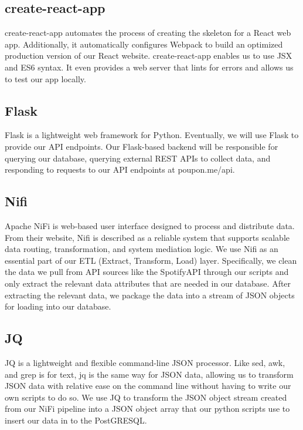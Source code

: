 \documentclass{scrartcl}
\begin{document}
    \subsection{create-react-app}\label{subsec:create-react-app}
    create-react-app automates the process of creating the skeleton for a React web app.
    Additionally, it automatically configures Webpack to build an optimized production version of our React website.
    create-react-app enables us to use JSX and ES6 syntax.
    It even provides a web server that lints for errors and allows us to test our app locally.

    \subsection{Flask}\label{subsec:flask}
    Flask is a lightweight web framework for Python.
    Eventually, we will use Flask to provide our API endpoints.
    Our Flask-based backend will be responsible for querying our database, querying external REST APIs to collect data, and responding to requests to our API endpoints at poupon.me/api.

    \subsection{Nifi}\label{subsec:nifi}
    Apache NiFi is web-based user interface designed to process and distribute data.
    From their website, Nifi is described as a reliable system that supports scalable data routing, transformation, and system mediation logic.
    We use Nifi as an essential part of our ETL (Extract, Transform, Load) layer.
    Specifically, we clean the data we pull from API sources like the SpotifyAPI through our scripts and only extract the relevant data attributes that are needed in our database.
    After extracting the relevant data, we package the data into a stream of JSON objects for loading into our database.

    \subsection{JQ}\label{subsec:jq}
    JQ is a lightweight and flexible command-line JSON processor.
    Like sed, awk, and grep is for text, jq is the same way for JSON data, allowing us to transform JSON data with relative ease on the command line without having to write our own scripts to do so.
    We use JQ to transform the JSON object stream created from our NiFi pipeline into a JSON object array that our python scripts use to insert our data in to the PostGRESQL.
\end{document}
